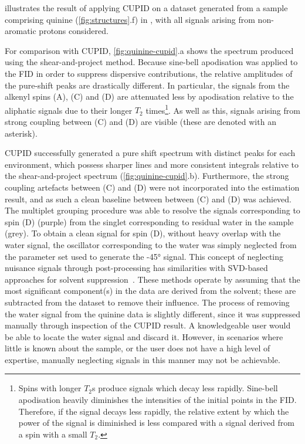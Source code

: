  illustrates the result of applying \ac{CUPID} on
a dataset generated from a sample comprising quinine (\cref{fig:structures}.f)
in ,
with all signals arising from non-aromatic protons considered.

For comparison with \ac{CUPID}, \cref{fig:quinine-cupid}.a shows the
spectrum produced using the shear-and-project method. Because
sine-bell apodisation was applied to the \ac{FID} in order to suppress dispersive
contributions, the relative amplitudes of the pure-shift
peaks are drastically different. In particular, the signals from the alkenyl
spins (A), (C) and (D) are attenuated less by apodisation relative to the
aliphatic signals due to their longer $T_2$ times\footnote{
    Spins with longer $T_2$s produce signals which decay less rapidly.
    Sine-bell apodisation heavily diminishes the intensities of the initial
    points in the \ac{FID}. Therefore, if the signal decays less rapidly, the
    relative extent by which the power of the signal is diminished is less
    compared with a signal derived from a spin with a small $T_2$.
}. As well as this, signals arising from strong coupling between (C) and
(D) are visible (these are denoted with an asterisk).

\ac{CUPID} successfully generated a pure shift spectrum with distinct peaks for
each  environment, which possess sharper lines and more consistent
integrals relative to the shear-and-project spectrum (\cref{fig:quinine-cupid}.b).
Furthermore, the strong coupling artefacts between (C) and (D) were not
incorporated into the estimation result, and as such a clean baseline between
between (C) and (D) was achieved.
The multiplet grouping procedure was able to resolve
the signals corresponding to spin (D) (purple) from the singlet corresponding
to residual water in the sample (grey).
To obtain a clean signal for spin (D), without heavy overlap with the water
signal, the oscillator corresponding to the water was simply neglected from
the parameter set used to generate the \ang{-45} signal. This concept of
neglecting nuisance signals through post-processing has similarities with
\ac{SVD}-based approaches for solvent suppression~\cite{Zhu1997}.
These methods operate by assuming that the most significant component(s) in the
data are derived from the solvent; these are subtracted from the dataset to
remove their influence. The process of removing the water signal from the quinine
data is slightly different, since it was suppressed manually through
inspection of the \ac{CUPID} result. A knowledgeable user would be able to
locate the water signal and discard it. However, in scenarios where little is
known about the sample, or the user does not have a high level of expertise,
manually neglecting signals in this manner may not be achievable.


